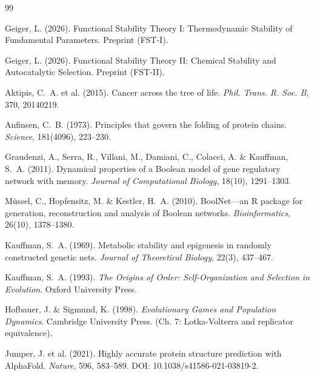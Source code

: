 \documentclass[12pt,a4paper]{article}
\theoremstyle{remark}
\begin{document}

\begin{thebibliography}{99}

Geiger, L. (2026).
\newblock Functional Stability Theory I: Thermodynamic Stability of Fundamental Parameters.
\newblock Preprint (FST-I).

Geiger, L. (2026).
\newblock Functional Stability Theory II: Chemical Stability and Autocatalytic Selection.
\newblock Preprint (FST-II).

Aktipis, C.~A. et al. (2015).
\newblock Cancer across the tree of life.
\newblock \textit{Phil. Trans. R. Soc. B}, 370, 20140219.

Anfinsen, C.~B. (1973).
\newblock Principles that govern the folding of protein chains.
\newblock \textit{Science}, 181(4096), 223--230.

Graudenzi, A., Serra, R., Villani, M., Damiani, C., Colacci, A. \& Kauffman, S.~A. (2011).
\newblock Dynamical properties of a Boolean model of gene regulatory network with memory.
\newblock \textit{Journal of Computational Biology}, 18(10), 1291--1303.

M\"ussel, C., Hopfensitz, M. \& Kestler, H.~A. (2010).
\newblock BoolNet---an R package for generation, reconstruction and analysis of Boolean networks.
\newblock \textit{Bioinformatics}, 26(10), 1378--1380.

Kauffman, S.~A. (1969).
\newblock Metabolic stability and epigenesis in randomly constructed genetic nets.
\newblock \textit{Journal of Theoretical Biology}, 22(3), 437--467.

Kauffman, S.~A. (1993).
\newblock \textit{The Origins of Order: Self-Organization and Selection in Evolution}.
\newblock Oxford University Press.

Hofbauer, J. \& Sigmund, K. (1998).
\newblock \textit{Evolutionary Games and Population Dynamics}.
\newblock Cambridge University Press. (Ch. 7: Lotka-Volterra and replicator equivalence).

Jumper, J. et al. (2021).
\newblock Highly accurate protein structure prediction with AlphaFold.
\newblock \textit{Nature}, 596, 583--589.
\newblock DOI: 10.1038/s41586-021-03819-2.


\end{thebibliography}
\end{document}

